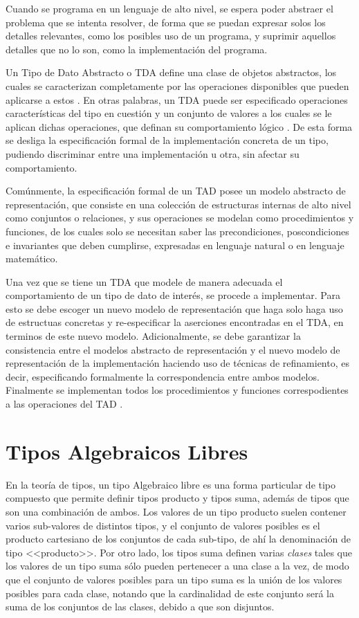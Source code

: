 Cuando se programa en un lenguaje de alto nivel, se espera poder abstraer el
problema que se intenta resolver, de forma que se puedan expresar solos los
detalles relevantes, como los posibles uso de un programa, y suprimir aquellos
detalles que no lo son, como la implementación del programa.

Un Tipo de Dato Abstracto o TDA define una clase de objetos abstractos, los
cuales se caracterizan completamente por las operaciones disponibles que
pueden aplicarse a estos \cite{liskov}. En otras palabras, un TDA puede ser
especificado operaciones características del tipo en cuestión y un conjunto de
valores a los cuales se le aplican dichas operaciones, que definan su
comportamiento lógico \cite{dalewalker}. De esta forma se desliga la
especificación formal de la implementación concreta de un tipo, pudiendo
discriminar entre una implementación u otra, sin afectar su comportamiento.

Comúnmente, la especificación formal de un TAD posee un modelo abstracto de
representación, que consiste en una colección de estructuras internas de alto
nivel como conjuntos o relaciones, y sus operaciones se modelan como
procedimientos y funciones, de los cuales solo se necesitan saber las
precondiciones, poscondiciones e invariantes que deben cumplirse, expresadas
en lenguaje natural o en lenguaje matemático.

Una vez que se tiene un TDA que modele de manera adecuada el comportamiento de
un tipo de dato de interés, se procede a implementar. Para esto se debe
escoger un nuevo modelo de representación que haga solo haga uso de estructuas
concretas y re-especificar la aserciones encontradas en el TDA, en terminos de
este nuevo modelo. Adicionalmente, se debe garantizar la consistencia entre el
modelos abstracto de representación y el nuevo modelo de representación de la
implementación haciendo uso de técnicas de refinamiento, es decir,
especificando formalmente la correspondencia entre ambos modelos. Finalmente
se implementan todos los procedimientos y funciones correspodientes a las
operaciones del TAD \cite{ravelo}.




\section{Tipos Algebraicos Libres}

En la teoría de tipos, un tipo Algebraico libre es una forma particular de tipo
compuesto que permite definir tipos producto y tipos suma, además de tipos que
son una combinación de ambos. Los valores de un tipo producto suelen contener
varios sub-valores de distintos tipos, y el conjunto de valores posibles es el
producto cartesiano de los conjuntos de cada sub-tipo, de ahí la denominación de
tipo <<producto>>. Por otro lado, los tipos suma definen varias \textit{clases}
tales que  los valores de un tipo suma sólo pueden pertenecer a una clase a la
vez, de modo que el conjunto de valores posibles para un tipo suma es la unión
de los valores posibles para cada clase, notando que la cardinalidad de este
conjunto será la suma de los conjuntos de las clases, debido a que son
disjuntos.


